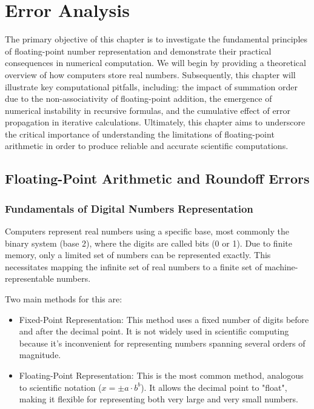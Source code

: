 \chapter{Error Analysis}
The primary objective of this chapter is to investigate the fundamental principles of floating-point number representation and demonstrate their practical consequences in numerical computation. We will begin by providing a theoretical overview of how computers store real numbers. Subsequently, this chapter will illustrate key computational pitfalls, including: the impact of summation order due to the non-associativity of floating-point addition, the emergence of numerical instability in recursive formulas, and the cumulative effect of error propagation in iterative calculations. Ultimately, this chapter aims to underscore the critical importance of understanding the limitations of floating-point arithmetic in order to produce reliable and accurate scientific computations.

\section{Floating-Point Arithmetic and Roundoff Errors}

\subsection{Fundamentals of Digital Numbers Representation}
Computers represent real numbers using a specific base, most commonly the binary system (base 2), where the digits are called bits (0 or 1). Due to finite memory, only a limited set of numbers can be represented exactly. This necessitates mapping the infinite set of real numbers to a finite set of machine-representable numbers.

Two main methods for this are:
\begin{itemize}
    \item Fixed-Point Representation: This method uses a fixed number of digits before and after the decimal point. It is not widely used in scientific computing because it's inconvenient for representing numbers spanning several orders of magnitude.
    \item Floating-Point Representation: This is the most common method, analogous to scientific notation ($x = \pm a \cdot b^{b}$). It allows the decimal point to "float", making it flexible for representing both very large and very small numbers.
\end{itemize}

